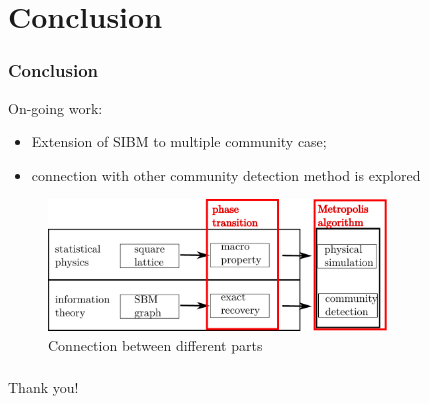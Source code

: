 \documentclass[notheorems]{beamer}
\begin{document}
\section{Conclusion}
\begin{frame}
\frametitle{Conclusion}
On-going work:
\begin{itemize}
\item Extension of SIBM to multiple community case;
\item connection with other community detection method is explored
\end{itemize}
\begin{figure}
	\includegraphics[width=0.8\textwidth]{overview.pdf}
	\caption{Connection between different parts}
\end{figure}
\end{frame}

\begin{frame}
\frametitle{}
\begin{block}{}
\centering
{\Huge Thank you!}
\end{block}
\end{frame}
\end{document}
